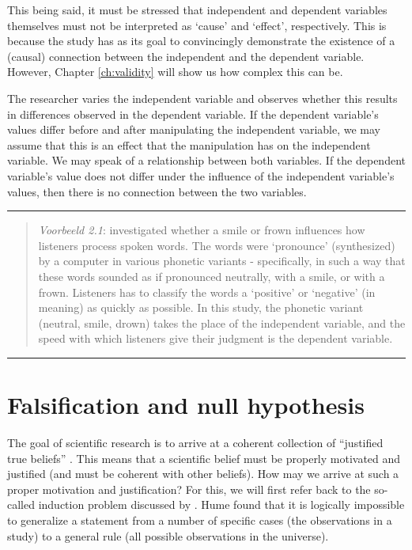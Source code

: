 \documentclass[
]{book}
\begin{document}
This being said, it must be stressed that independent and dependent variables themselves must not be interpreted as `cause' and `effect', respectively. This is because the study has as its goal to convincingly demonstrate the existence of a (causal) connection between the independent and the dependent variable. However, Chapter \ref{ch:validity} will show us how complex this can be.

The researcher varies the independent variable and observes whether this results in differences observed in the dependent variable. If the dependent variable's values differ before and after manipulating the independent variable, we may assume that this is an effect that the manipulation has on the independent variable. We may speak of a relationship between both variables. If the dependent variable's value does not differ under the influence of the independent variable's values, then there is no connection between the two variables.

\begin{center}\rule{0.5\linewidth}{0.5pt}\end{center}

\begin{quote}
\emph{Voorbeeld 2.1}:
\citet{QSF12} investigated whether a smile or frown influences how listeners process spoken words. The words were `pronounce' (synthesized) by a computer in various phonetic variants - specifically, in such a way that these words sounded as if pronounced neutrally, with a smile, or with a frown. Listeners has to classify the words a `positive' or `negative' (in meaning) as quickly as possible. In this study, the phonetic variant (neutral, smile, drown) takes the place of the independent variable, and the speed with which listeners give their judgment is the dependent variable.
\end{quote}

\begin{center}\rule{0.5\linewidth}{0.5pt}\end{center}

\hypertarget{sec:falsification}{%
\section{Falsification and null hypothesis}\label{sec:falsification}}

The goal of scientific research is to arrive at a coherent collection of ``justified true beliefs'' \citep{Mort03}. This means that a scientific belief must be properly motivated and justified (and must be coherent with other beliefs). How may we arrive at such a proper motivation and justification? For this, we will first refer back to the so-called induction problem discussed by \citet{Hume1739}. Hume found that it is logically impossible to generalize a statement from a number of specific cases (the observations in a study) to a general rule (all possible observations in the universe).
\end{document}
